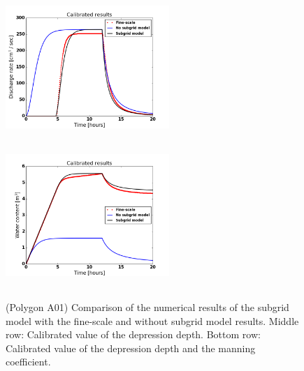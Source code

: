 \documentclass[review,11pt]{elsarticle}
\begin{document}
\begin{figure}[!h]
\includegraphics[width=6.2cm, height=5.5cm]{./figures/POLYGON_A01/POLYGON_A01dischargeCalibDDManning.png}
\includegraphics[width=6.2cm, height=5.5cm]{./figures/POLYGON_A01/POLYGON_A01watercontentCalibDDManning.png}
\caption{(Polygon A01) Comparison of the numerical results of the subgrid model with the fine-scale and without subgrid model results. Middle row: Calibrated value of the depression depth. Bottom row: Calibrated value of the depression depth and the manning coefficient.}
\label{polygon-A01}
\end{figure}
\end{document}
